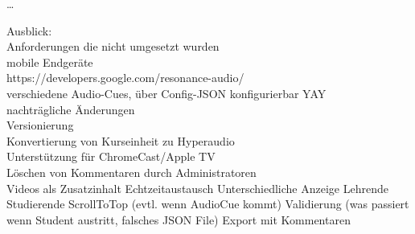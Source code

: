 \dots


Ausblick:\\
Anforderungen die nicht umgesetzt wurden\\
mobile Endgeräte\\
https://developers.google.com/resonance-audio/\\
verschiedene Audio-Cues, über Config-JSON konfigurierbar YAY\\
nachträgliche Änderungen\\
Versionierung\\
Konvertierung von Kurseinheit zu Hyperaudio\\
Unterstützung für ChromeCast/Apple TV\\
Löschen von Kommentaren durch Administratoren\\
Videos als Zusatzinhalt
Echtzeitaustausch
Unterschiedliche Anzeige Lehrende Studierende
ScrollToTop (evtl. wenn AudioCue kommt)
Validierung (was passiert wenn Student austritt, falsches JSON File)
Export mit Kommentaren